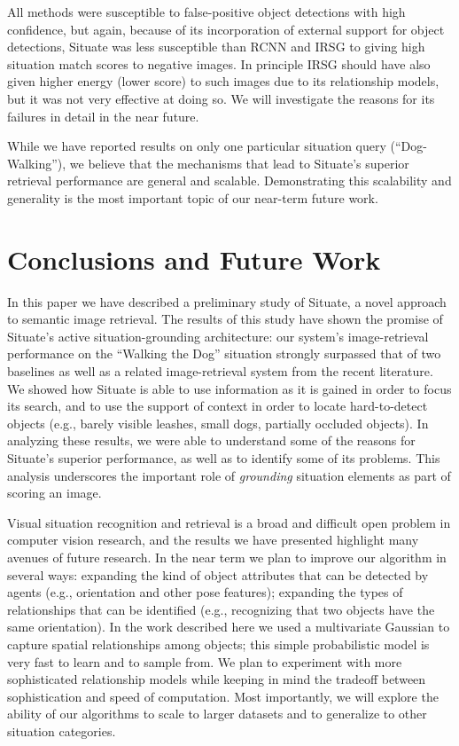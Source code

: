 \documentclass[conference]{IEEEtran}
\begin{document}
All methods were susceptible to false-positive object detections with
high confidence, but again, because of its incorporation of external
support for object detections, Situate was less susceptible than RCNN
and IRSG to giving high situation match scores to negative images.  In
principle IRSG should have also given higher energy (lower score) to
such images due to its relationship models, but it was not very
effective at doing so.  We will investigate the reasons for its failures in detail
in the near future.

While we have reported results on only one particular situation query
(``Dog-Walking''), we believe that the mechanisms that lead to
Situate's superior retrieval performance are general and
scalable. Demonstrating this scalability and generality is the most
important topic of our near-term future work.  

\section{Conclusions and Future Work}

In this paper we have described a preliminary study of Situate, a
novel approach to semantic image retrieval.  The results of this study
have shown the promise of Situate's active situation-grounding
architecture: our system's image-retrieval performance on the
``Walking the Dog'' situation strongly surpassed that of two baselines
as well as a related image-retrieval system from the recent
literature.  We showed how Situate is able to use information as it is
gained in order to focus its search, and to use the support of context
in order to locate hard-to-detect objects (e.g., barely visible
leashes, small dogs, partially occluded objects).  In analyzing these
results, we were able to understand some of the reasons for Situate's
superior performance, as well as to identify some of its problems.
This analysis underscores the important role of {\it grounding}
situation elements as part of scoring an image.

Visual situation recognition and retrieval is a broad and difficult
open problem in computer vision research, and the results we have
presented highlight many avenues of future research.  In the near term
we plan to improve our algorithm in several ways: 
expanding the kind of object attributes that can be detected by agents
(e.g., orientation and other pose features); expanding the types of
relationships that can be identified (e.g., recognizing that two
objects have the same orientation).  In the work described here we
used a multivariate Gaussian to capture spatial relationships among
objects; this simple probabilistic model is very fast to learn and to
sample from.  We plan to experiment with more sophisticated relationship
models
while keeping in
mind the tradeoff between sophistication and speed of computation.
Most importantly, we will explore the ability of our algorithms to
scale to larger datasets and to generalize to other situation
categories.
\end{document}
